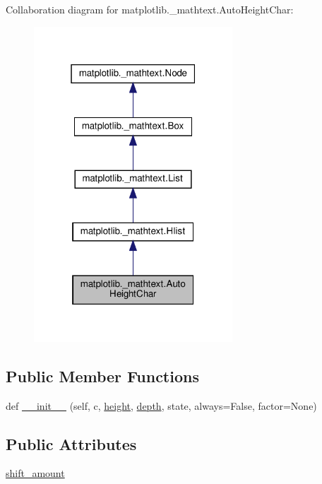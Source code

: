 Collaboration diagram for matplotlib.\+\_\+mathtext.\+Auto\+Height\+Char\+:
\nopagebreak
\begin{figure}[H]
\begin{center}
\leavevmode
\includegraphics[width=211pt]{classmatplotlib_1_1__mathtext_1_1AutoHeightChar__coll__graph}
\end{center}
\end{figure}
\subsection*{Public Member Functions}
\begin{DoxyCompactItemize}
\item 
def \hyperlink{classmatplotlib_1_1__mathtext_1_1AutoHeightChar_a0fead496d36e683c65eabe8b3be1c1b3}{\+\_\+\+\_\+init\+\_\+\+\_\+} (self, c, \hyperlink{classmatplotlib_1_1__mathtext_1_1Hlist_ad4da62a3f586721d3ff2fd30c5f43705}{height}, \hyperlink{classmatplotlib_1_1__mathtext_1_1Hlist_a349cf825e904929d3b410c4e46fe20a9}{depth}, state, always=False, factor=None)
\end{DoxyCompactItemize}
\subsection*{Public Attributes}
\begin{DoxyCompactItemize}
\item 
\hyperlink{classmatplotlib_1_1__mathtext_1_1AutoHeightChar_aa3d10c7511b8575f8b839cd38e639543}{shift\+\_\+amount}
\end{DoxyCompactItemize}


